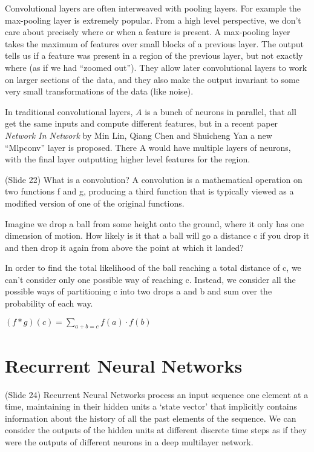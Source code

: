 \documentclass[twocolumn]{article}
\begin{document}
Convolutional layers are often interweaved with pooling layers. For example the
max-pooling layer is extremely popular. From a high level perspective, we don’t
care about precisely where or when a feature is present. A max-pooling layer
takes the maximum of features over small blocks of a previous layer. The output
tells us if a feature was present in a region of the previous layer, but not
exactly where (as if we had ``zoomed out''). They allow later convolutional layers
to work on larger sections of the data, and they also make the output invariant
to some very small transformations of the data (like noise).

In traditional convolutional layers, \(A\) is a bunch of neurons in parallel,
that all get the same inputs and compute different features, but in a recent
paper \textit{Network In Network} by Min Lin, Qiang Chen and Shuicheng Yan a new
``Mlpconv'' layer is proposed. There A would have multiple layers of neurons, with
the final layer outputting higher level features for the region.

(Slide 22) What is a convolution? A convolution is a mathematical operation on
two functions f and g, producing a third function that is typically viewed as a
modified version of one of the original functions.

Imagine we drop a ball from some height onto the ground, where it only has one
dimension of motion. How likely is it that a ball will go a distance c if you
drop it and then drop it again from above the point at which it landed?

In order to find the total likelihood of the ball reaching a total distance of
c, we can’t consider only one possible way of reaching c. Instead, we consider
all the possible ways of partitioning c into two drops a and b and sum over the
probability of each way.

\((f \ast g)(c) = \sum_{a+b=c} f(a) \cdot f(b)\)

\section{Recurrent Neural Networks}
(Slide 24) Recurrent Neural Networks process an input sequence one element at a
time, maintaining in their hidden units a ‘state vector’ that implicitly
contains information about the history of all the past elements of the
sequence. We can consider the outputs of the hidden units at different discrete
time steps as if they were the outputs of different neurons in a deep multilayer
network.
\end{document}
